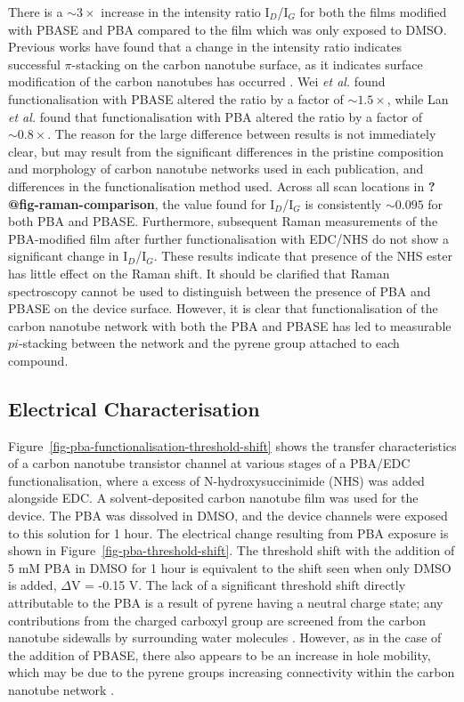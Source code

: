 \documentclass[
  a4paper,
]{scrbook}
\begin{document}
There is a \(\sim 3 \times\) increase in the intensity ratio
I\(_D\)/I\(_G\) for both the films modified with PBASE and PBA compared
to the film which was only exposed to DMSO. Previous works have found
that a change in the intensity ratio indicates successful
\(\pi\)-stacking on the carbon nanotube surface, as it indicates surface
modification of the carbon nanotubes has occurred
\autocite{Wei2010,Lan2013}. Wei \emph{et al.} \autocite{Wei2010} found
functionalisation with PBASE altered the ratio by a factor of
\(\sim 1.5 \times\), while Lan \emph{et al.} \autocite{Lan2013} found
that functionalisation with PBA altered the ratio by a factor of
\(\sim 0.8 \times\). The reason for the large difference between results
is not immediately clear, but may result from the significant
differences in the pristine composition and morphology of carbon
nanotube networks used in each publication, and differences in the
functionalisation method used. Across all scan locations in
\textbf{?@fig-raman-comparison}, the value found for I\(_D\)/I\(_G\) is
consistently \(\sim 0.095\) for both PBA and PBASE. Furthermore,
subsequent Raman measurements of the PBA-modified film after further
functionalisation with EDC/NHS do not show a significant change in
I\(_D\)/I\(_G\). These results indicate that presence of the NHS ester
has little effect on the Raman shift. It should be clarified that Raman
spectroscopy cannot be used to distinguish between the presence of PBA
and PBASE on the device surface. However, it is clear that
functionalisation of the carbon nanotube network with both the PBA and
PBASE has led to measurable \(pi\)-stacking between the network and the
pyrene group attached to each compound.

\hypertarget{electrical-characterisation}{%
\subsection{Electrical
Characterisation}\label{electrical-characterisation}}

Figure~\ref{fig-pba-functionalisation-threshold-shift} shows the
transfer characteristics of a carbon nanotube transistor channel at
various stages of a PBA/EDC functionalisation, where a excess of
N-hydroxysuccinimide (NHS) was added alongside EDC. A solvent-deposited
carbon nanotube film was used for the device. The PBA was dissolved in
DMSO, and the device channels were exposed to this solution for 1 hour.
The electrical change resulting from PBA exposure is shown in
Figure~\ref{fig-pba-threshold-shift}. The threshold shift with the
addition of 5 mM PBA in DMSO for 1 hour is equivalent to the shift seen
when only DMSO is added, \(\Delta\)V = -0.15 V. The lack of a
significant threshold shift directly attributable to the PBA is a result
of pyrene having a neutral charge state; any contributions from the
charged carboxyl group are screened from the carbon nanotube sidewalls
by surrounding water molecules \autocite{Lerner2012}. However, as in the
case of the addition of PBASE, there also appears to be an increase in
hole mobility, which may be due to the pyrene groups increasing
connectivity within the carbon nanotube network
\autocite{Murugathas2019b}.
\end{document}
